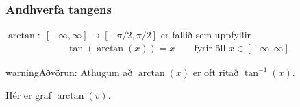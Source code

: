 \documentclass[a4paper,10pt,icelandic]{sphinxmanual}
\begin{document}
\subsubsection{Andhverfa tangens}
\label{\detokenize{Kafli07:andhverfa-tangens}}
\(\arctan: \; [-\infty,\infty] \rightarrow [−\pi/2, \pi/2]\) er fallið sem uppfyllir
\begin{equation*}
\begin{split}\tan(\arctan(x)) = x \qquad \text{fyrir öll  } x \in [−\infty, \infty]\end{split}
\end{equation*}
\begin{sphinxadmonition}{warning}{Aðvörun:}
Athugum að \(\arctan(x)\) er oft ritað \(\tan^{-1}(x)\).
\end{sphinxadmonition}


Hér er graf \(\arctan(v)\).
\end{document}
